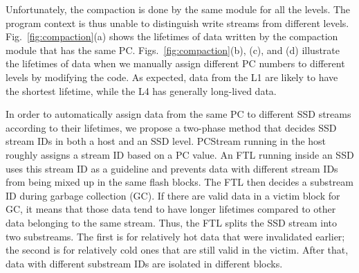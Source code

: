 Unfortunately, the compaction is done by the same module for all the levels.
The program context is thus unable to distinguish write streams from different
levels. Fig.~\ref{fig:compaction}(a) shows the lifetimes of data written by
the compaction module that has the same PC.  Figs.~\ref{fig:compaction}(b),
(c), and (d) illustrate the lifetimes of data when we manually assign different
PC numbers to different levels by modifying the code.  As expected, data from
the L1 are likely to have the shortest lifetime, while the L4 has generally
long-lived data.

In order to automatically assign data from the same PC to different SSD streams
according to their lifetimes, we propose a two-phase method that decides SSD
stream IDs in both a host and an SSD level.  {\sf PCStream} running in the host
roughly assigns a stream ID based on a PC value.  An FTL running inside an SSD
uses this stream ID as a guideline and prevents data with different stream IDs
from being mixed up in the same flash blocks. The FTL then decides a substream
ID during garbage collection (GC). If there are valid data in a victim block
for GC, it means that those data tend to have longer lifetimes compared to
other data belonging to the same stream. Thus, the FTL splits the SSD stream
into two substreams.  The first is for relatively hot data that were
invalidated earlier; the second is for relatively cold ones that are still
valid in the victim.  After that, data with different substream IDs are
isolated in different blocks. 

